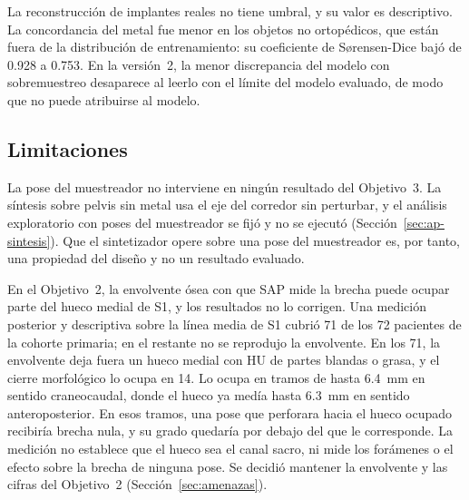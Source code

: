 La reconstrucción de implantes reales no tiene umbral, y su valor es descriptivo. La concordancia del metal fue menor en los objetos no ortopédicos, que están fuera de la distribución de entrenamiento: su coeficiente de Sørensen-Dice bajó de 0.928 a 0.753. En la versión~2, la menor discrepancia del modelo con sobremuestreo desaparece al leerlo con el límite del modelo evaluado, de modo que no puede atribuirse al modelo.

\subsection{Limitaciones}

 

La pose del muestreador no interviene en ningún resultado del Objetivo~3. La síntesis sobre pelvis sin metal usa el eje del corredor sin perturbar, y el análisis exploratorio con poses del muestreador se fijó y no se ejecutó (Sección~\ref{sec:ap-sintesis}). Que el sintetizador opere sobre una pose del muestreador es, por tanto, una propiedad del diseño y no un resultado evaluado.

En el Objetivo~2, la envolvente ósea con que SAP mide la brecha puede ocupar parte del hueco medial de S1, y los resultados no lo corrigen. Una medición posterior y descriptiva sobre la línea media de S1 cubrió 71 de los 72 pacientes de la cohorte primaria; en el restante no se reprodujo la envolvente. En los 71, la envolvente deja fuera un hueco medial con HU de partes blandas o grasa, y el cierre morfológico lo ocupa en 14. Lo ocupa en tramos de hasta 6.4~mm en sentido craneocaudal, donde el hueco ya medía hasta 6.3~mm en sentido anteroposterior. En esos tramos, una pose que perforara hacia el hueco ocupado recibiría brecha nula, y su grado quedaría por debajo del que le corresponde. La medición no establece que el hueco sea el canal sacro, ni mide los forámenes o el efecto sobre la brecha de ninguna pose. Se decidió mantener la envolvente y las cifras del Objetivo~2 (Sección~\ref{sec:amenazas}).


